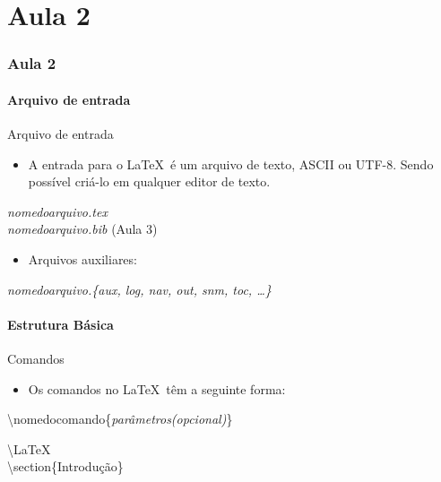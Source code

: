 
\part{Aula 2}
\section{Aula 2}

\subsection{Arquivo de entrada}

\begin{frame}{Arquivo de entrada}
	\begin{itemize}
	\item A entrada para o \LaTeX\ é um arquivo de texto, ASCII ou UTF-8. Sendo possível criá-lo em qualquer editor de texto.
	\end{itemize}
	
	\alert{\it nomedoarquivo.tex \\ nomedoarquivo.bib} (Aula 3)

	\vspace{.5cm}
	\pause

	\begin{itemize}
	\item Arquivos auxiliares:
	\end{itemize}
	
	{\it nomedoarquivo.\{aux, log, nav, out, snm, toc, \dots\} }
\end{frame}

\subsection{Estrutura Básica}

\begin{frame}{Comandos}
	\begin{itemize}
	\item Os comandos no \LaTeX\ têm a seguinte forma:
	\end{itemize}

	\alert{\textbackslash nomedocomando\{\textit{parâmetros(opcional)}\} }
	
	\vspace{.5cm}

	\begin{example}
		\textbackslash LaTeX \\
		\textbackslash section\{Introdução\}		
	\end{example}
\end{frame}

